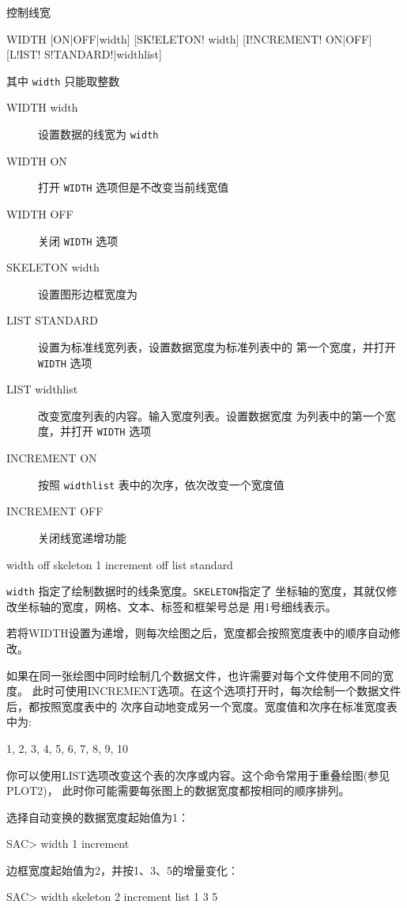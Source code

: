 \label{cmd:width}

控制线宽

\begin{SACSTX}
WIDTH [ON|OFF|width] [SK!ELETON! width] [I!NCREMENT! ON|OFF]
    [L!IST! S!TANDARD!|widthlist]
\end{SACSTX}
其中 \texttt{width} 只能取整数

\begin{description}
\item [WIDTH width] 设置数据的线宽为 \texttt{width}
\item [WIDTH ON] 打开 \texttt{WIDTH} 选项但是不改变当前线宽值
\item [WIDTH OFF] 关闭 \texttt{WIDTH} 选项
\item [SKELETON width] 设置图形边框宽度为 
\item [LIST STANDARD] 设置为标准线宽列表，设置数据宽度为标准列表中的
    第一个宽度，并打开 \texttt{WIDTH} 选项
\item [LIST widthlist] 改变宽度列表的内容。输入宽度列表。设置数据宽度
    为列表中的第一个宽度，并打开 \texttt{WIDTH} 选项
\item [INCREMENT ON] 按照 \texttt{widthlist} 表中的次序，依次改变一个宽度值
\item [INCREMENT OFF] 关闭线宽递增功能
\end{description}

\begin{SACDFT}
width off skeleton 1 increment off list standard
\end{SACDFT}

\texttt{width} 指定了绘制数据时的线条宽度。\texttt{SKELETON}指定了
坐标轴的宽度，其就仅修改坐标轴的宽度，网格、文本、标签和框架号总是
用1号细线表示。

若将WIDTH设置为递增，则每次绘图之后，宽度都会按照宽度表中的顺序自动修改。

如果在同一张绘图中同时绘制几个数据文件，也许需要对每个文件使用不同的宽度。
此时可使用INCREMENT选项。在这个选项打开时，每次绘制一个数据文件后，都按照宽度表中的
次序自动地变成另一个宽度。宽度值和次序在标准宽度表中为:
\begin{SACCode}
1, 2, 3, 4, 5, 6, 7, 8, 9, 10
\end{SACCode}
你可以使用LIST选项改变这个表的次序或内容。这个命令常用于重叠绘图(参见PLOT2)，
此时你可能需要每张图上的数据宽度都按相同的顺序排列。

选择自动变换的数据宽度起始值为1：
\begin{SACCode}
SAC> width 1 increment
\end{SACCode}

边框宽度起始值为2，并按1、3、5的增量变化：
\begin{SACCode}
SAC> width skeleton 2 increment list 1 3 5
\end{SACCode}
